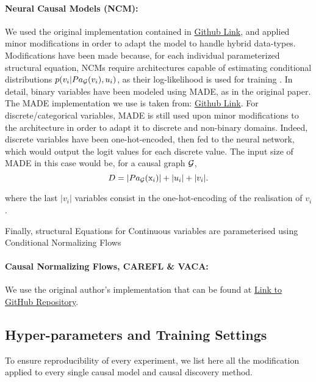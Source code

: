 \paragraph{Neural Causal Models (NCM):} We used the original implementation contained in \href{https://github.com/CausalAILab/NeuralCausalModels}{Github Link}, and applied minor modifications in order to adapt the model to handle hybrid data-types. Modifications have been made because, for each individual parameterized structural equation, NCMs require architectures capable of estimating conditional distributions $p(v_i|\displaystyle Pa_{\mathcal{G}}(v_i), u_i)$, as their log-likelihood is used for training \cite{xia2022causalneuralconnectionexpressivenesslearnability}.
In detail, binary variables have been modeled using MADE, as in the original paper. The MADE implementation we use is taken from: \href{https://github.com/karpathy/pytorch-made}{Github Link}.
For discrete/categorical variables, MADE is still used upon minor modifications to the architecture in order to adapt it to discrete and non-binary domains. Indeed, discrete variables have been one-hot-encoded, then fed to the neural network, which would output the logit values for each discrete value. The input size of MADE in this case would be, for a causal graph $\displaystyle {\mathcal{G}}$, 
\begin{equation}
    D = |\displaystyle Pa_{\mathcal{G}}({\textnormal{x}}_i)| + |u_i| + |v_i|.
\end{equation}

where the last $|v_i|$ variables consist in the one-hot-encoding of the realisation of $v_i$.

Finally, structural Equations for Continuous variables are parameterised using Conditional Normalizing Flows
\cite{winkler2023learninglikelihoodsconditionalnormalizing}

\paragraph{Causal Normalizing Flows, CAREFL \& VACA:} We use the original author's implementation that can be found at \href{https://github.com/psanch21/causal-flows}{Link to GitHub Repository}.

\subsection{Hyper-parameters and Training Settings}

To ensure reproducibility of every experiment, we list here all the modification applied to every single causal model and causal discovery method.

